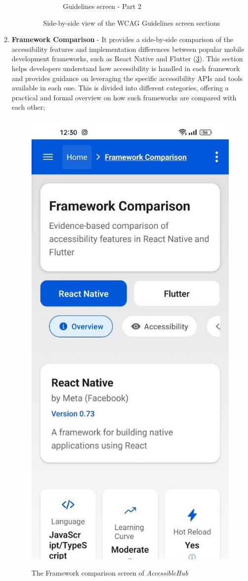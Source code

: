 \begin{enumerate}
\begin{itemize}
\begin{figure}[ht]
\begin{subfigure}[b]{0.43\textwidth}
                \caption{Guidelines screen - Part 2}
                \label{fig:guidelines-right}
            \end{subfigure}
            \caption{Side-by-side view of the WCAG Guidelines screen sections}
            \label{fig:guidelines_screens_sidebyside}
        \end{figure}

        \FloatBarrier
        
    \end{itemize}

\item \textbf{Framework Comparison} - It provides a side-by-side comparison of the accessibility features and implementation differences between popular mobile development frameworks, such as React Native and Flutter (\ref{fig:frameworks-comparison}). This section helps developers understand how accessibility is handled in each framework and provides guidance on leveraging the specific accessibility APIs and tools available in each one. This is divided into different categories, offering a practical and formal overview on how such frameworks are compared with each other;

\begin{figure}[ht]
\centering
\includegraphics[width=0.4\linewidth, alt={Screenshot of the Framework comparison screen of AccessibleHub}]{img/frameworks-comparison.jpg}
\caption{The Framework comparison screen of \textit{AccessibleHub}}\label{fig:frameworks-comparison}
\end{figure}


\end{enumerate}
